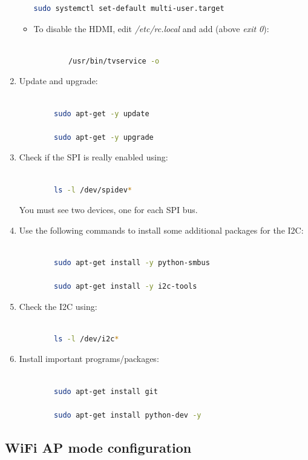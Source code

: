 \documentclass[12pt,a4paper,oneside]{article} %
\begin{document}
\begin{enumerate}
\begin{itemize}
\begin{lstlisting}[language=sh]
			sudo systemctl set-default multi-user.target
		\end{lstlisting}
		\item To disable the HDMI, edit \textit{/etc/rc.local} and add (above \textit{exit 0}):
		\begin{lstlisting}[language=sh,style=textstyle]
	
		/usr/bin/tvservice -o
		\end{lstlisting}
	\end{itemize}
	\item Update and upgrade:
	\begin{lstlisting}[language=sh]
	
		sudo apt-get -y update
		
		sudo apt-get -y upgrade
	\end{lstlisting}
	\item Check if the SPI is really enabled using:
	\begin{lstlisting}[language=sh]
	
		ls -l /dev/spidev*
	\end{lstlisting}
	
	You must see two devices, one for each SPI bus.
	\item Use the following commands to install some additional packages for the I2C:
	\begin{lstlisting}[language=sh]
	
		sudo apt-get install -y python-smbus
		
		sudo apt-get install -y i2c-tools
	\end{lstlisting}
	\item Check the I2C using:
	\begin{lstlisting}[language=sh]
	
		ls -l /dev/i2c*
	\end{lstlisting}
	\item Install important programs/packages:
	\begin{lstlisting}[language=sh]
	
		sudo apt-get install git
		
		sudo apt-get install python-dev -y
	\end{lstlisting}
\end{enumerate}
\pagebreak

\subsection{WiFi AP mode configuration}
\end{document}
